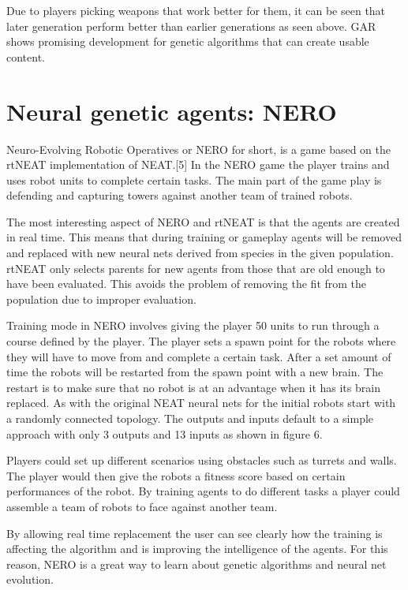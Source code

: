 \documentclass[12pt]{ucthesis} \newif\ifpdf \ifx\pdfoutput\undefined
\begin{document}
Due to players picking weapons that work better for them, it can be seen that
later generation perform better than earlier generations as seen above. GAR
shows promising development for genetic algorithms that can create usable
content.

\section{Neural genetic agents: NERO}

Neuro-Evolving Robotic Operatives or NERO for short, is a game based on the
rtNEAT implementation of NEAT.[5] In the NERO game the player trains and uses
robot units to complete certain tasks. The main part of the game play is
defending and capturing towers against another team of trained robots.

The most interesting aspect of NERO and rtNEAT is that the agents are created in
real time. This means that during training or gameplay agents will be removed
and replaced with new neural nets derived from species in the given population.
rtNEAT only selects parents for new agents from those that are old enough to
have been evaluated. This avoids the problem of removing the fit from the
population due to improper evaluation.

Training mode in NERO involves giving the player 50 units to run through a
course defined by the player. The player sets a spawn point for the robots where
they will have to move from and complete a certain task. After a set amount of
time the robots will be restarted from the spawn point with a new brain. The
restart is to make sure that no robot is at an advantage when it has its brain
replaced. As with the original NEAT neural nets for the initial robots start
with a randomly connected topology. The outputs and inputs default to a simple
approach with only 3 outputs and 13 inputs as shown in figure 6.

Players could set up different scenarios using obstacles such as turrets and
walls. The player would then give the robots a fitness score based on certain
performances of the robot. By training agents to do different tasks a player
could assemble a team of robots to face against another team.

By allowing real time replacement the user can see clearly how the training is
affecting the algorithm and is improving the intelligence of the agents. For
this reason, NERO is a great way to learn about genetic algorithms and neural
net evolution.
\end{document}
